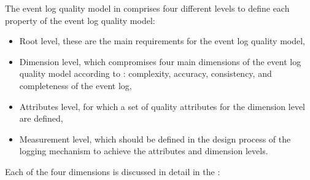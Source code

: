 The event log quality model in  comprises four different levels to define each property of the event log quality model:

\begin{itemize}
	\item Root level, these are the main requirements for the event log quality model,
	\item Dimension level, which compromises four main dimensions of the event log quality model according to \cite{Kherbouche2017}: complexity, accuracy, consistency, and completeness of the event log,
	\item Attributes level, for which a set of quality attributes for the dimension level are defined,
	\item Measurement level, which should be defined in the design process of the logging mechanism to achieve the attributes and dimension levels.
\end{itemize}

\clearpage

Each of the four dimensions is discussed in detail in the :

